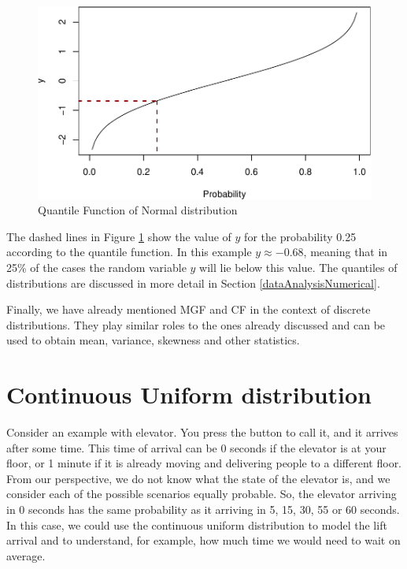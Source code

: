 \documentclass[
]{book}
\theoremstyle{definition}
\theoremstyle{definition}
\theoremstyle{definition}
\theoremstyle{definition}
\theoremstyle{remark}
\begin{document}
\begin{figure}
\centering
\includegraphics{Svetunkov---Statistics-for-Business-Analytics_files/figure-latex/dnormPlotIntroQF-1.pdf}
\caption{\label{fig:dnormPlotIntroQF}Quantile Function of Normal distribution}
\end{figure}

The dashed lines in Figure \ref{fig:dnormPlotIntroQF} show the value of \(y\) for the probability 0.25 according to the quantile function. In this example \(y \approx -0.68\), meaning that in 25\% of the cases the random variable \(y\) will lie below this value. The quantiles of distributions are discussed in more detail in Section \ref{dataAnalysisNumerical}.

Finally, we have already mentioned MGF and CF in the context of discrete distributions. They play similar roles to the ones already discussed and can be used to obtain mean, variance, skewness and other statistics.

\section{Continuous Uniform distribution}\label{distributionsUniformContinuous}

Consider an example with elevator. You press the button to call it, and it arrives after some time. This time of arrival can be 0 seconds if the elevator is at your floor, or 1 minute if it is already moving and delivering people to a different floor. From our perspective, we do not know what the state of the elevator is, and we consider each of the possible scenarios equally probable. So, the elevator arriving in 0 seconds has the same probability as it arriving in 5, 15, 30, 55 or 60 seconds. In this case, we could use the continuous uniform distribution to model the lift arrival and to understand, for example, how much time we would need to wait on average.
\end{document}
